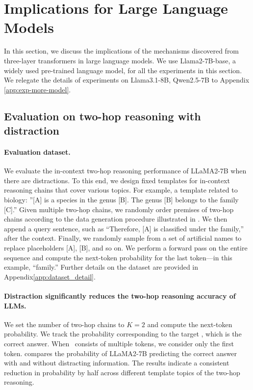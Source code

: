 \section{Implications for Large Language Models}
\label{sec:impl_llm}
In this section, we discuss the implications of the mechanisms discovered from three-layer transformers in large language models. We use Llama2-7B-base, a widely used pre-trained language model, for all the experiments in this section. We relegate the details of experiments on Llama3.1-8B, Qwen2.5-7B to Appendix \ref{app:exp-more-model}.

\subsection{Evaluation on two-hop reasoning with distraction}
\label{sec:llama-initial}
\paragraph{Evaluation dataset.}
We evaluate the in-context two-hop reasoning performance of LLaMA2-7B when there are distractions. To this end, we design fixed templates for in-context reasoning chains that cover various topics. For example, a template related to biology: ”[A] is a species in the genus [B]. The genus [B] belongs to the family [C].” Given multiple two-hop chains, we randomly order premises of two-hop chains according to the data generation procedure illustrated in .
We then append a query sentence, such as “Therefore, [A] is classified under the family,” after the context. Finally, we randomly sample from a set of artificial names to replace placeholders [A], [B], and so on. We perform a forward pass on the entire sequence and compute the next-token probability for the last token—in this example, “family.” Further details on the dataset are provided in Appendix\ref{app:dataset_detail}.

\paragraph{Distraction significantly reduces the two-hop reasoning accuracy of LLMs.}
We set the number of two-hop chains to  $K=2$  and compute the next-token probability. We track the probability corresponding to the target \Ed, which is the correct answer. When \Ed~consists of multiple tokens, we consider only the first token.  compares the probability of LLaMA2-7B predicting the correct answer with and without distracting information. The results indicate a consistent reduction in probability by half across different template topics of the two-hop reasoning.


